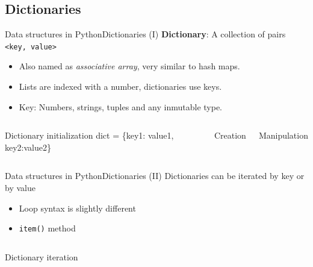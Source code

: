 \documentclass[10pt,compress]{beamer} %
\begin{document}
\subsection{Dictionaries}
\begin{frame}{Data structures in Python}{Dictionaries (I)}
	\textbf{Dictionary}: A collection of pairs \texttt{<key, value>}
		\begin{itemize}
		\item Also named as \textit{associative array}, very similar to hash maps.
		\item Lists are indexed with a number, dictionaries use keys.
		\item Key: Numbers, strings, tuples and any inmutable type.
		\end{itemize}

    \begin{columns}

        \begin{block}{Dictionary initialization}
        dict = \{key1: value1, key2:value2\}
		\end{block}

 	    \scriptsize{
		\begin{exampleblock}{Creation}
		\vspace{-0.2cm}
		
		\vspace{-0.2cm}
		\end{exampleblock}
		\vspace{0.7cm}
        }
 	    \scriptsize{
		\begin{exampleblock}{Manipulation}
		\vspace{-0.2cm}
		
		\vspace{-0.2cm}
		\end{exampleblock}
        }
	\end{columns}
\end{frame}

\begin{frame}{Data structures in Python}{Dictionaries (II)}
	Dictionaries can be iterated by key or by value
		\begin{itemize}
		\item Loop syntax is slightly different
		\item \texttt{item()} method
		\end{itemize}

    \begin{columns}
		\begin{exampleblock}{Dictionary iteration}
		\vspace{-0.2cm}
		
		\vspace{-0.2cm}
		\end{exampleblock}
	\end{columns}
\end{frame}
\end{document}

